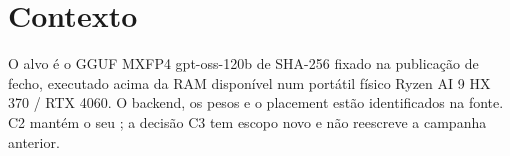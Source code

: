 \section{Contexto}
O alvo é o GGUF MXFP4 gpt-oss-120b de SHA-256 fixado na publicação de fecho, executado acima da RAM disponível num portátil físico Ryzen AI 9 HX 370 / RTX 4060. O backend, os pesos e o placement estão identificados na fonte. C2 mantém o seu ; a decisão C3 tem escopo novo e não reescreve a campanha anterior. 
